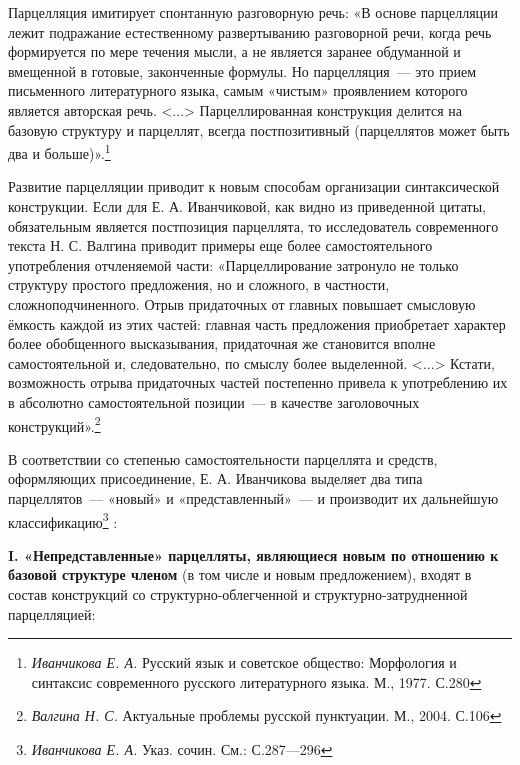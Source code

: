 \documentclass{kursa4}
\begin{document}
      {Парцелляция имитирует спонтанную разговорную речь:
      «В основе парцелляции лежит подражание естественному развертыванию
      разговорной речи, когда речь формируется по мере течения мысли, а не
      является заранее обдуманной и вмещенной в готовые, законченные формулы.
      Но парцелляция~--- это прием письменного литературного языка, самым
      «чистым» проявлением которого является авторская речь.
      \textless{}...\textgreater{} Парцеллированная конструкция делится на
      базовую структуру и парцеллят, }{всегда
      постпозитивный}{ (парцеллятов может быть два и
      больше)».}\footnote{\textit{{ Иванчикова Е. А.
      }}{Русский язык и советское общество: Морфология и
      синтаксис современного русского литературного языка. М.,
      1977.}\textit{{
      }}{С.280}}{ }

      {Развитие парцелляции приводит к новым способам
      организации синтаксической конструкции. Если для Е. А. Иванчиковой, как
      видно из приведенной цитаты, обязательным является постпозиция
      парцеллята, то исследователь современного текста Н. С. Валгина приводит
      примеры еще более самостоятельного употребления отчленяемой части:
      «Парцеллирование затронуло не только структуру простого предложения, но
      и сложного, в частности, сложноподчиненного. Отрыв придаточных от
      главных повышает смысловую ёмкость каждой из этих частей: главная часть
      предложения }{приобретает характер более
      обо}{б}{щенного высказывания,
      придаточная же становится вполне самостоятельной и, следовательно, по
      смыслу более выделенной. \textless{}...\textgreater{} Кстати,
      возможность отрыва придаточных частей постепенно привела к употреблению
      их в абсолютно самостоятельной позиции~--- в качестве заголовочных
      конструкций».}\footnote{\textit{{ Валгина Н. С.
      }}{Актуальные проблемы русской пунктуации. М., 2004.
      С.106}}{ }

      {В соответствии со степенью самостоятельности
      парцеллята и средств, оформляющих присоединение, Е. А. Иванчикова
      выделяет два типа парцеллятов~--- «новый» и «представленный»~--- и
      производит их дальнейшую
      классификацию}\footnote{\textit{{Иванчикова Е. А.
      }}{Указ. сочин. См.: С.287—296}}{ :}

      \textbf{I. «Непредставленные» парцелляты, являющиеся
      новым по отношению к базовой структуре членом} (в том числе и
      новым предложением), входят в состав конструкций со
      структурно-облегченной и структурно-затрудненной парцелляцией:
\end{document}
